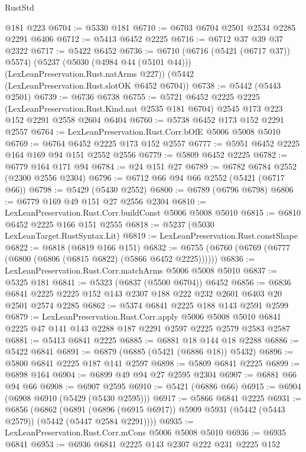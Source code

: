 \begin{lexlean}{RustStd}
\begin{coremodule}
{\begin{coremodule}
{{{{{{{{{{{{    @181
    @223
@6704 := @5330 @181
@6710 := @6703 @6704 @2501 @2534 @2285 @2291 @6406
@6712 := @5413 @6452 @2225
@6716 := @6712 @37 @39 @37 @2322
@6717 := @5422 @6452
@6736 := @6710
    (@6716 (@5421 (@6717 @37)) @5574)
    (@5237 (@5030 (@4984 @44 (@5101 @44))) (LexLeanPreservation.Rust.natArms @227))
    (@5442 (LexLeanPreservation.Rust.slotOK @6452 @6704))
@6738 := @5442 (@5443 @2501)
@6739 := @6736 @6738
@6755 := @5721
    @6452
    @2225
    @2225
    (LexLeanPreservation.Rust.Kind.nat @2535 @181 @6704)
    @2545
    @173
    @223
    @152
    @2291
    @2558
    @2604
    @6404
@6760 := @5738 @6452 @173 @152 @2291 @2557
@6764 := LexLeanPreservation.Rust.Corr.bOfE @5006 @5008 @5010
@6769 := @6764 @6452 @2225 @173 @152 @2557
@6777 := @5951 @6452 @2225 @164 @169 @94 @151 @2552 @2556
@6779 := @5809 @6452 @2225
@6782 := @6779 @164 @171 @94
@6784 := @24 @151 @27
@6789 := @6782 @6784 @2552 (@2300 @2556 @2304)
@6796 := @6712 @66 @94 @66 @2552 (@5421 (@6717 @66))
@6798 := @5429 (@5430 @2552)
@6800 := @6789 (@6796 @6798)
@6806 := @6779 @169 @49 @151 @27 @2556 @2304
@6810 := LexLeanPreservation.Rust.Corr.buildConst @5006 @5008 @5010
@6815 := @6810 @6452 @2225 @166 @151 @2555
@6818 := @5237 (@5030 LexLeanTarget.RustSyntax.Lit)
@6819 := LexLeanPreservation.Rust.constShape
@6822 := @6818 (@6819 @166 @151)
@6832 := @6755 (@6760 (@6769 (@6777 (@6800 (@6806 (@6815 @6822) (@5866 @6452 @2225))))))
@6836 := LexLeanPreservation.Rust.Corr.matchArms @5006 @5008 @5010
@6837 := @5325 @181
@6841 := @5323 (@6837 (@5500 @6704)) @6452
@6856 := @6836 @6841 @2225 @2225 @152 @143 @2307 @188 @222 @232 @2601 @6403 @20 @2501 @2574 @2285
@6862 := @5374 @6841 @2225 @188 @143 @2591 @2599
@6879 := LexLeanPreservation.Rust.Corr.apply
    @5006
    @5008
    @5010
    @6841
    @2225
    @47
    @141
    @143
    @2288
    @187
    @2291
    @2597
    @2225
    @2579
    @2583
    @2587
@6881 := @5413 @6841 @2225
@6885 := @6881 @18 @144 @18 @2288
@6886 := @5422 @6841
@6891 := @6879 (@6885 (@5421 (@6886 @18)) @5432)
@6896 := @5800 @6841 @2225 @187 @141 @2597
@6898 := @5809 @6841 @2225
@6899 := @6898 @164
@6904 := @6899 @49 @94 @27 @2595 @2304
@6907 := @6881 @66 @94 @66
@6908 := @6907 @2595
@6910 := @5421 (@6886 @66)
@6915 := @6904 (@6908 @6910 (@5429 (@5430 @2595)))
@6917 := @5866 @6841 @2225
@6931 := @6856
    (@6862
      (@6891 (@6896 (@6915 @6917)) @5909 @5931 (@5442 (@5443 @2579)) (@5442 (@5447 @2584 @2291))))
@6935 := LexLeanPreservation.Rust.Corr.mCons @5006 @5008 @5010
@6936 := @6935 @6841
@6953 := @6936
    @6841
    @2225
    @143
    @2307
    @222
    @231
    @2225
    @152
}}}}}}}}}}}}
\end{coremodule}}
\end{coremodule}
\end{lexlean}
